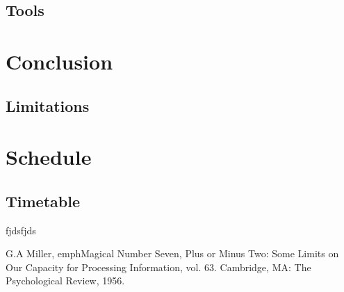 \documentclass[a4paper, 11pt]{article}
\begin{document}
\subsection{Tools}

\clearpage

\section{Conclusion}
\subsection{Limitations}

\clearpage


\section{Schedule}
\subsection{Timetable}

\clearpage


\begin{thebibliography}{11}

	fjdsfjds
	
	G.A Miller, emph{Magical Number Seven, Plus or Minus Two: Some Limits on Our Capacity for Processing Information}, vol. 63. Cambridge, MA: The Psychological Review, 1956.

\end{thebibliography}
\end{document}

